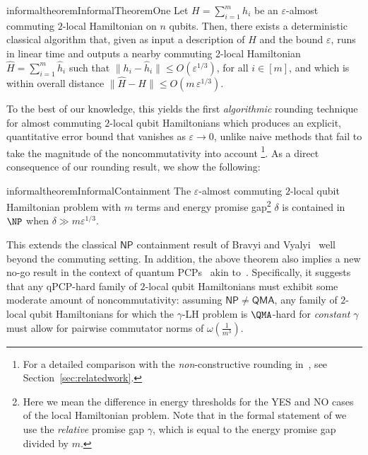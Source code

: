 \documentclass[a4paper,onecolumn,11pt]{quantumarticle}
\theoremstyle{plain}
\newcommand{\eps}{\varepsilon}
\begin{document}
\begin{restatable}{informaltheorem}{InformalTheoremOne}
Let $H=\sum_{i=1}^m h_i$ be an $\eps$-almost commuting $2$-local 
Hamiltonian on $n$ qubits. Then, there exists a deterministic classical algorithm that, given as input a description of $H$ and the bound $\eps$, runs 
in linear time and outputs a nearby commuting 2-local Hamiltonian $\hat{H}=\sum_{i=1}^m 
\hat{h}_i$ such that $\|h_i - \hat{h}_i\| \leq O(\eps^{1/3})$, for all
$i \in [m]$, and which is within overall distance 
$\|\hat{H} - H\| \leq O(m \,\eps^{1/3})$.
\end{restatable}
To the best of our knowledge, this yields the first \emph{algorithmic} rounding technique for almost commuting $2$-local qubit Hamiltonians which produces an explicit, quantitative error bound that vanishes as $\varepsilon \rightarrow 0$, unlike naive methods that fail to take the magnitude of the noncommutativity into account
\footnote{For a detailed comparison with the \emph{non}-constructive rounding in~\cite{arad2011notepartialnogotheorem}, see Section~\ref{sec:relatedwork}.}.
As a direct consequence of our rounding result, we show the following:



\begin{restatable}{informaltheorem}{InformalContainment}
    The $\eps$-almost commuting $2$-local qubit Hamiltonian problem with $m$ terms and energy promise gap\footnote{Here we mean the difference in energy thresholds for the YES and NO cases of the local Hamiltonian problem. Note that in the formal statement of  we use the \emph{relative} promise gap $\gamma$, which is equal to the energy promise gap divided by $m$.} $\delta$ is contained in $\NP$ when $\delta \gg m \eps^{1/3}$.
\end{restatable}
This extends the classical $\mathsf{NP}$ containment result of Bravyi and Vyalyi~\cite{bravyi2004commutativeversionklocalhamiltonian} well
beyond the commuting setting.
In addition, the above theorem also implies a new no-go result in the context of quantum PCPs~\cite{aharonov2011complexity,Hastings2012} akin to~\cite{arad2011notepartialnogotheorem}. Specifically, it suggests that any qPCP-hard family of $2$-local qubit Hamiltonians must exhibit some moderate amount of noncommutativity: assuming $\mathsf{NP} \neq \mathsf{QMA}$, any
family of $2$-local qubit Hamiltonians for which the $\gamma$-LH problem is $\QMA$-hard for \emph{constant} $\gamma$ must allow for pairwise commutator norms of $\omega(\frac{1}{m^3})$.
\end{document}
